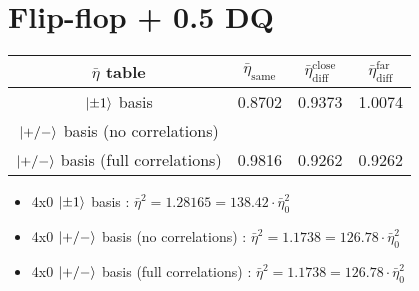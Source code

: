 \documentclass[a4paper]{article}
\begin{document}
\section{Flip-flop + 0.5 DQ}
\begin{tabular}{cccc}

\hline
$\bar{\eta}$ table & $\bar{\eta}_\textrm{same}$ & $\bar{\eta}_\textrm{diff}^\textrm{close}$ & $\bar{\eta}_\textrm{diff}^\textrm{far}$ \\
\hline
$\ket{\pm 1}$ basis & 0.8702 & 0.9373 & 1.0074 \\
$\ket{+/-}$ basis (no correlations) &   &  &  \\
$\ket{+/-}$ basis (full correlations) & 0.9816 & 0.9262 & 0.9262 \\
\hline
\end{tabular}
\begin{itemize}
\item 4x0 $\ket{\pm 1}$ basis : $\bar{\eta}^2 = 1.28165 = 138.42 \cdot \bar{\eta}^2_0$
\item 4x0 $\ket{+/-}$ basis (no correlations) : $\bar{\eta}^2 = 1.1738 = 126.78 \cdot \bar{\eta}^2_0$
\item 4x0 $\ket{+/-}$ basis (full correlations) : $\bar{\eta}^2 = 1.1738 = 126.78 \cdot \bar{\eta}^2_0$
\end{itemize}
\end{document}
